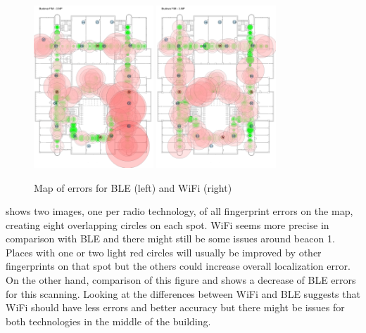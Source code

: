 \begin{figure}[h!]
	\begin{centering}
		\includegraphics[width=0.4\textwidth]{img/third_data_collection_ble_errors}
		\includegraphics[width=0.4\textwidth]{img/third_data_collection_wifi_errors}
		\par\end{centering}
	\caption{Map of errors for BLE (left) and WiFi (right)}
	\label{fig03c06}
\end{figure}

 shows two images, one per radio technology, of all fingerprint errors on the map, creating eight overlapping circles on each spot. WiFi seems more precise in comparison with BLE and there might still be some issues around beacon 1. Places with one or two light red circles will usually be improved by other fingerprints on that spot but the others could increase overall localization error. On the other hand, comparison of this figure and  shows a decrease of BLE errors for this scanning. Looking at the differences between WiFi and BLE suggests that WiFi should have less errors and better accuracy but there might be issues for both technologies in the middle of the building.

